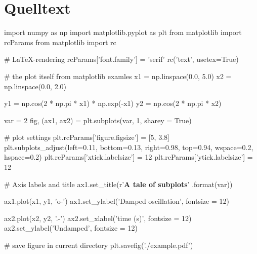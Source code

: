 \clearpage
\appendix
\chapter{Quelltext}
\label{Quelltext}

\begin{python}
import numpy as np
import matplotlib.pyplot as plt
from matplotlib import rcParams
from matplotlib import rc

# LaTeX-rendering
rcParams['font.family'] = 'serif'
rc('text', usetex=True)

# the plot itself from matplotlib examles
x1 = np.linspace(0.0, 5.0)
x2 = np.linspace(0.0, 2.0)

y1 = np.cos(2 * np.pi * x1) * np.exp(-x1)
y2 = np.cos(2 * np.pi * x2)

var = 2
fig, (ax1, ax2) = plt.subplots(var, 1, sharey = True)

# plot settings
plt.rcParams['figure.figsize'] = [5, 3.8]
plt.subplots_adjust(left=0.11, bottom=0.13, right=0.98, top=0.94,
		wspace=0.2, hspace=0.2)
plt.rcParams['xtick.labelsize'] = 12
plt.rcParams['ytick.labelsize'] = 12

# Axis labels and title
ax1.set_title(r'\textbf{{\textsf{{A tale of {} subplots}}}}'
		.format(var))

ax1.plot(x1, y1, 'o-')
ax1.set_ylabel('Damped oscillation', fontsize = 12)

ax2.plot(x2, y2, '.-')
ax2.set_xlabel('time (s)', fontsize = 12)
ax2.set_ylabel('Undamped', fontsize = 12)

# save figure in current directory
plt.savefig('./example.pdf')
\end{python}

